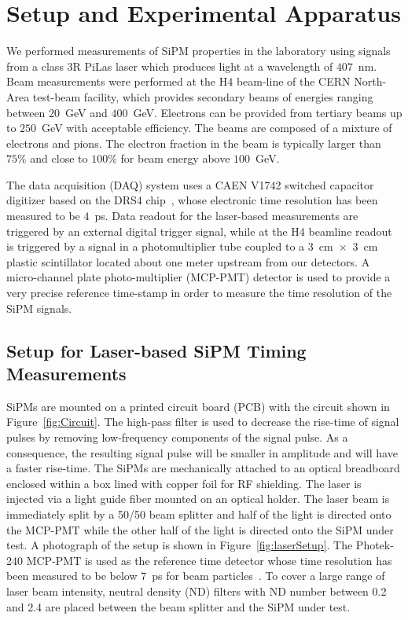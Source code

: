 \section{Setup and Experimental Apparatus }
\label{sec:setup}

We performed measurements of SiPM properties in the laboratory using
signals from a class 3R PiLas laser which produces light at a wavelength of
$407$~nm. Beam measurements were performed at the H4 beam-line of the CERN
North-Area test-beam facility, which provides secondary beams of energies
ranging between $20$~GeV and $400$~GeV. Electrons can be provided from tertiary beams up to 
$250$~GeV with acceptable efficiency. The beams are composed of a mixture of
electrons and pions. The electron fraction in the beam is typically larger than 
$75\%$ and close to $100\%$ for beam energy above $100$~GeV.

The data acquisition (DAQ) system uses a CAEN V1742 switched capacitor digitizer
based on the DRS4 chip~\cite{DRS4}, whose electronic time resolution has been
measured to be $4$~ps. Data readout for the laser-based measurements are
triggered by an external digital trigger signal, while at the H4 beamline
readout is triggered by a signal in a photomultiplier tube coupled to a
$3$~$\mathrm{cm}$~$\times$~$3$~$\mathrm{cm}$ plastic scintillator located about
one meter upstream from our detectors. A micro-channel plate photo-multiplier
(MCP-PMT) detector is used to provide a very precise reference time-stamp in
order to measure the time resolution of the SiPM signals.

\subsection{Setup for Laser-based SiPM Timing Measurements}

SiPMs are mounted on a printed circuit board (PCB) with the circuit shown in
Figure~\ref{fig:Circuit}. The high-pass filter is used to decrease the rise-time
of signal pulses by removing low-frequency components of the signal pulse. As a
consequence, the resulting signal pulse will be smaller in amplitude and will
have a faster rise-time. The SiPMs are mechanically attached to an optical
breadboard enclosed within a box lined with copper foil for RF shielding. The
laser is injected via a light guide fiber mounted on an optical holder. The
laser beam is immediately split by a 50/50 beam splitter and half of the light
is directed onto the MCP-PMT while the other half of the light is directed onto
the SiPM under test. A photograph of the setup is shown in
Figure~\ref{fig:laserSetup}. The Photek-240 MCP-PMT is used as the reference
time detector whose time resolution has been measured to be below $7$~ps for
beam particles~\cite{MCPShowerMaxPaper}. To cover a large range of laser beam
intensity, neutral density (ND) filters with ND number between 0.2 and 2.4 are
placed between the beam splitter and the SiPM under test.

